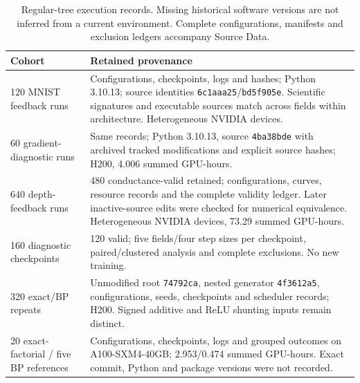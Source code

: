 \begin{table}[tbp]
\centering
\caption{Regular-tree execution records. Missing historical software versions are not inferred from a current environment. Complete configurations, manifests and exclusion ledgers accompany Source Data.}
\label{tab:regular_archive}
\small
\begin{tabularx}{\textwidth}{p{}X}
\toprule
Cohort & Retained provenance \\
\midrule
120 MNIST feedback runs & Configurations, checkpoints, logs and hashes; Python 3.10.13; source identities \texttt{6c1aaa25}/\texttt{bd5f905e}. Scientific signatures and executable sources match across fields within architecture. Heterogeneous NVIDIA devices. \\
60 gradient-diagnostic runs & Same records; Python 3.10.13, source \texttt{4ba38bde} with archived tracked modifications and explicit source hashes; H200, 4.006 summed GPU-hours. \\
640 depth-feedback runs & 480 conductance-valid retained; configurations, curves, resource records and the complete validity ledger. Later inactive-source edits were checked for numerical equivalence. Heterogeneous NVIDIA devices, 73.29 summed GPU-hours. \\
160 diagnostic checkpoints & 120 valid; five fields/four step sizes per checkpoint, paired/clustered analysis and complete exclusions. No new training. \\
320 exact/BP repeats & Unmodified root \texttt{74792ca}, nested generator \texttt{4f3612a5}, configurations, seeds, checkpoints and scheduler records; H200. Signed additive and ReLU shunting inputs remain distinct. \\
20 exact-factorial / five BP references & Configurations, checkpoints, logs and grouped outcomes on A100-SXM4-40GB; 2.953/0.474 summed GPU-hours. Exact commit, Python and package versions were not recorded. \\
\bottomrule
\end{tabularx}
\end{table}



